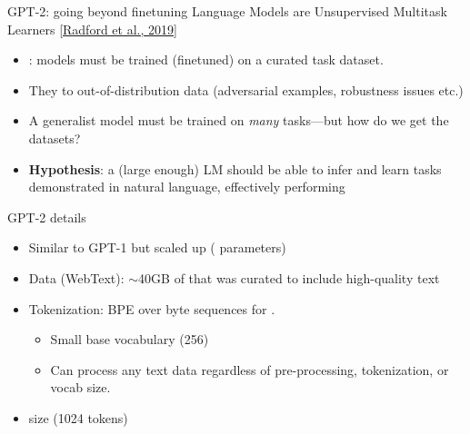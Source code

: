 \documentclass[usenames,dvipsnames,notes,11pt,aspectratio=169,hyperref={colorlinks=true, linkcolor=blue}]{beamer}
\begin{document}
\begin{frame}
    {GPT-2: going beyond finetuning}
    Language Models are Unsupervised Multitask Learners \href{https://d4mucfpksywv.cloudfront.net/better-language-models/language-models.pdf}{[Radford et al., 2019]}
    
    \begin{itemize}
        \item {}: models must be trained (finetuned) on a curated task dataset.
        \item They  to out-of-distribution data (adversarial examples, robustness issues etc.) 
        \item A generalist model must be trained on {\em many} tasks---but how do we get the datasets?
        \item \textbf{Hypothesis}: a (large enough) LM should be able to infer and learn tasks demonstrated in natural language, effectively performing 
    \end{itemize}
\end{frame}

\begin{frame}
    {GPT-2 details}
    \begin{itemize}
        \item Similar to GPT-1 but {scaled up} ( parameters)
        \item Data (WebText): $\sim$40GB of  that was curated to include high-quality text
        \item Tokenization: BPE over byte sequences for . 
            \begin{itemize}
                \item Small base vocabulary (256)
                \item Can process any text data regardless of pre-processing, tokenization, or vocab size. 
            \end{itemize}
        \item {} size (1024 tokens)
    \end{itemize}
\end{frame}
\end{document}
